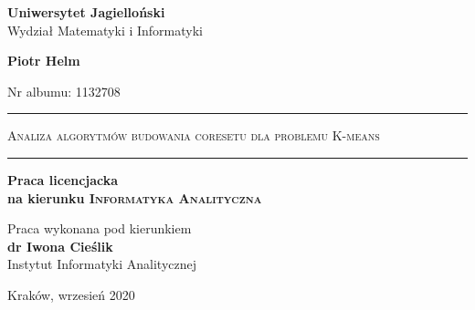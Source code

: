 \begin{titlepage}
    \begin{center}
        \LARGE
        \textbf{Uniwersytet Jagielloński}\\
        Wydział Matematyki i Informatyki
    
        \vspace{1.5in}
        \Large
        \textbf{Piotr Helm}
    
        \large
        Nr albumu: 1132708
        
        \vspace{0.5em}
        \LARGE
        \rule{\textwidth}{1pt}
        \textsc{Analiza algorytmów budowania coresetu dla problemu K-means}
        \rule{\textwidth}{1pt}
    
        \vspace{1em}
        \Large
        \textbf{Praca licencjacka}\\
        \textbf{na kierunku \textsc{Informatyka Analityczna}}
    
        \large
        \vspace{1in}
        \hfill
        \parbox{\textwidth}{
            \centering
            Praca wykonana pod kierunkiem \\
            \textbf{dr Iwona Cieślik} \\
            Instytut Informatyki Analitycznej
            }
    
        \vfill
        \Large
        Kraków, wrzesień 2020
    \end{center}
    \end{titlepage}